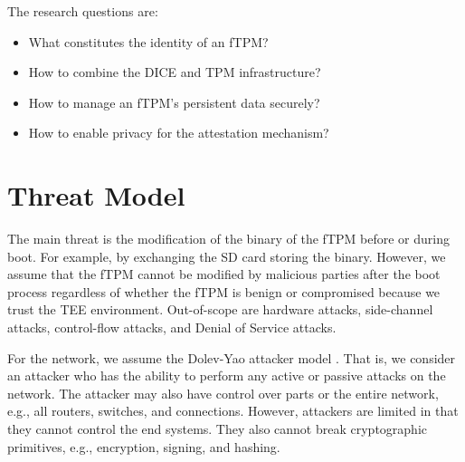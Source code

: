 
The research questions are:
\begin{itemize}
  \item What constitutes the identity of an fTPM? %
  \item How to combine the DICE and TPM infrastructure? %
  \item How to manage an fTPM's persistent data securely? %
  \item How to enable privacy for the attestation mechanism?
\end{itemize}



\section{Threat Model}



The main threat is the modification of the binary of the fTPM before or during boot. For example, by exchanging the SD card storing the binary.
However, we assume that the fTPM cannot be modified by malicious parties after the boot process regardless of whether the fTPM is benign or compromised because we trust the TEE environment.
Out-of-scope are hardware attacks, side-channel attacks, control-flow attacks, and Denial of Service attacks.

For the network, we assume the Dolev-Yao attacker model \cite{Dolev1983}. That is, we consider an attacker who has the ability to perform any active or passive attacks on the network. The attacker may also have control over parts or the entire network, e.g., all routers, switches, and connections. However, attackers are limited in that they cannot control the end systems. They also cannot break cryptographic primitives, e.g., encryption, signing, and hashing.

